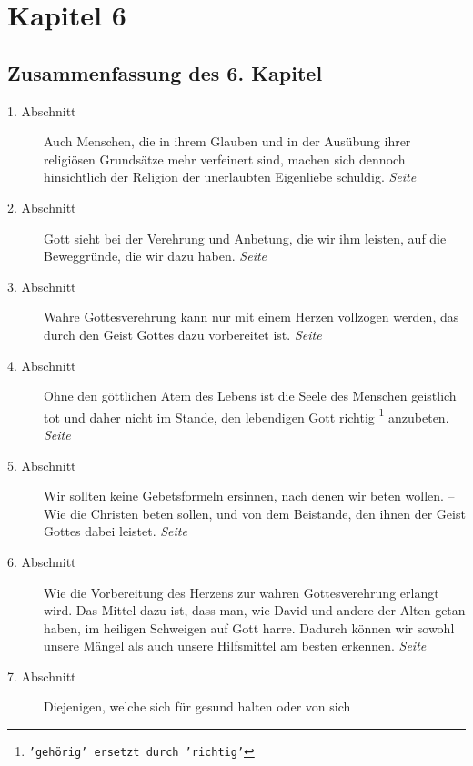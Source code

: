 

\chapter{Kapitel 6}  \label{kap6}

\section{Zusammenfassung des 6. Kapitel}

\begin{description}
\item[1. Abschnitt] Auch Menschen, die in ihrem Glauben und in der Ausübung
ihrer religiösen Grundsätze mehr verfeinert sind, machen sich dennoch
hinsichtlich der Religion der unerlaubten Eigenliebe schuldig.
\dotfill \textit{Seite~\pageref{kap6_ab1}}\\
\item[2. Abschnitt] Gott sieht bei der Verehrung und Anbetung, die wir ihm
leisten, auf die Beweggründe, die wir dazu haben.
\dotfill \textit{Seite~\pageref{kap6_ab2}}\\
\item[3. Abschnitt] Wahre Gottesverehrung kann nur mit einem Herzen vollzogen
werden, das durch den Geist Gottes dazu vorbereitet ist.
\dotfill \textit{Seite~\pageref{kap6_ab3}}\\
\item[4. Abschnitt] Ohne den göttlichen Atem des Lebens ist die Seele des
Menschen geistlich tot und daher nicht im Stande, den lebendigen Gott richtig
\footnote{\texttt{'gehörig' ersetzt durch 'richtig'}}
anzubeten.
\dotfill \textit{Seite~\pageref{kap6_ab4}}\\
\item[5. Abschnitt] Wir sollten keine Gebetsformeln ersinnen, nach denen wir
beten wollen. -- Wie die Christen beten sollen, und von dem Beistande, den ihnen
der Geist Gottes dabei leistet.
\dotfill \textit{Seite~\pageref{kap6_ab5}}\\
\item[6. Abschnitt] Wie die Vorbereitung des Herzens zur wahren Gottesverehrung
erlangt wird. Das Mittel dazu ist, dass man, wie David und andere der Alten
getan haben, im heiligen Schweigen auf Gott harre. Dadurch können wir sowohl
unsere Mängel als auch unsere Hilfsmittel am besten erkennen.
\dotfill \textit{Seite~\pageref{kap6_ab6}}\\
\item[7. Abschnitt] Diejenigen, welche sich für gesund halten oder von sich

\end{description}
